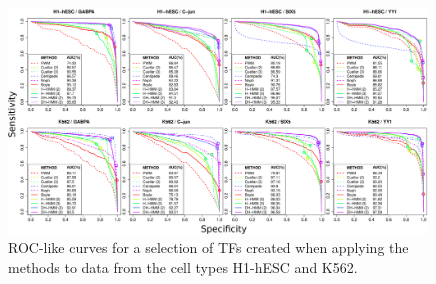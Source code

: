 \documentclass{bioinfo}
\begin{document}
\begin{figure}[t]
\centering
     \includegraphics[width=0.99\textwidth]{ROC.eps}
\caption{{\color{red} ROC-like} curves for a selection of TFs created when applying the methods to data from the cell types H1-hESC and K562.}
\label{fig:roc}
\end{figure}
\end{document}
